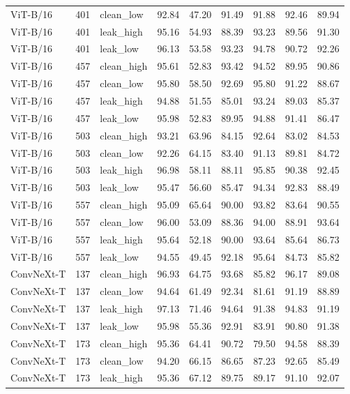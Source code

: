 {\begin{longtable}{lrlrrrrrr}
ViT-B/16 & 401 & clean\_low & 92.84 & 47.20 & 91.49 & 91.88 & 92.46 & 89.94 \\
ViT-B/16 & 401 & leak\_high & 95.16 & 54.93 & 88.39 & 93.23 & 89.56 & 91.30 \\
ViT-B/16 & 401 & leak\_low & 96.13 & 53.58 & 93.23 & 94.78 & 90.72 & 92.26 \\
ViT-B/16 & 457 & clean\_high & 95.61 & 52.83 & 93.42 & 94.52 & 89.95 & 90.86 \\
ViT-B/16 & 457 & clean\_low & 95.80 & 58.50 & 92.69 & 95.80 & 91.22 & 88.67 \\
ViT-B/16 & 457 & leak\_high & 94.88 & 51.55 & 85.01 & 93.24 & 89.03 & 85.37 \\
ViT-B/16 & 457 & leak\_low & 95.98 & 52.83 & 89.95 & 94.88 & 91.41 & 86.47 \\
ViT-B/16 & 503 & clean\_high & 93.21 & 63.96 & 84.15 & 92.64 & 83.02 & 84.53 \\
ViT-B/16 & 503 & clean\_low & 92.26 & 64.15 & 83.40 & 91.13 & 89.81 & 84.72 \\
ViT-B/16 & 503 & leak\_high & 96.98 & 58.11 & 88.11 & 95.85 & 90.38 & 92.45 \\
ViT-B/16 & 503 & leak\_low & 95.47 & 56.60 & 85.47 & 94.34 & 92.83 & 88.49 \\
ViT-B/16 & 557 & clean\_high & 95.09 & 65.64 & 90.00 & 93.82 & 83.64 & 90.55 \\
ViT-B/16 & 557 & clean\_low & 96.00 & 53.09 & 88.36 & 94.00 & 88.91 & 93.64 \\
ViT-B/16 & 557 & leak\_high & 95.64 & 52.18 & 90.00 & 93.64 & 85.64 & 86.73 \\
ViT-B/16 & 557 & leak\_low & 94.55 & 49.45 & 92.18 & 95.64 & 84.73 & 85.82 \\
ConvNeXt-T & 137 & clean\_high & 96.93 & 64.75 & 93.68 & 85.82 & 96.17 & 89.08 \\
ConvNeXt-T & 137 & clean\_low & 94.64 & 61.49 & 92.34 & 81.61 & 91.19 & 88.89 \\
ConvNeXt-T & 137 & leak\_high & 97.13 & 71.46 & 94.64 & 91.38 & 94.83 & 91.19 \\
ConvNeXt-T & 137 & leak\_low & 95.98 & 55.36 & 92.91 & 83.91 & 90.80 & 91.38 \\
ConvNeXt-T & 173 & clean\_high & 95.36 & 64.41 & 90.72 & 79.50 & 94.58 & 88.39 \\
ConvNeXt-T & 173 & clean\_low & 94.20 & 66.15 & 86.65 & 87.23 & 92.65 & 85.49 \\
ConvNeXt-T & 173 & leak\_high & 95.36 & 67.12 & 89.75 & 89.17 & 91.10 & 92.07 \\

\end{longtable}}
